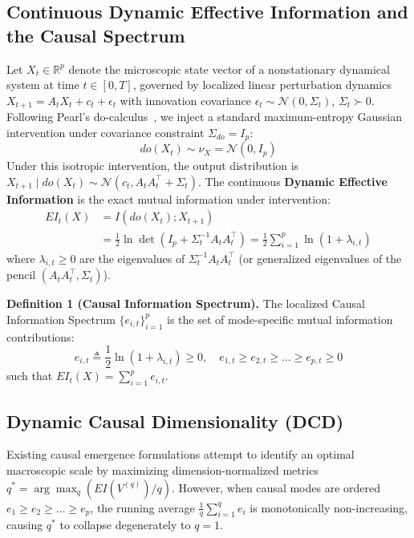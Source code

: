 \documentclass[10pt,twocolumn,journal]{article}
\begin{document}
\subsection{Continuous Dynamic Effective Information and the Causal Spectrum}
Let $X_t \in \mathbb{R}^p$ denote the microscopic state vector of a nonstationary dynamical system at time $t \in [0, T]$, governed by localized linear perturbation dynamics $X_{t+1} = A_t X_t + c_t + \epsilon_t$ with innovation covariance $\epsilon_t \sim \mathcal{N}(0, \Sigma_t)$, $\Sigma_t \succ 0$. Following Pearl's do-calculus~\cite{pearl2009causality,hoel2013quantifying}, we inject a standard maximum-entropy Gaussian intervention under covariance constraint $\Sigma_{do} = I_p$:
\begin{equation}
do(X_t) \sim \nu_X = \mathcal{N}(0, I_p)
\label{eq:intervention_def}
\end{equation}
Under this isotropic intervention, the output distribution is $X_{t+1} \mid do(X_t) \sim \mathcal{N}(c_t, A_t A_t^\top + \Sigma_t)$. The continuous \textbf{Dynamic Effective Information} is the exact mutual information under intervention:
\begin{equation}
\begin{aligned}
EI_t(X) &= I(do(X_t) ; X_{t+1}) \\
&= \frac{1}{2} \ln \det \left( I_p + \Sigma_t^{-1} A_t A_t^\top \right) = \frac{1}{2} \sum_{i=1}^p \ln \left( 1 + \lambda_{i,t} \right)
\end{aligned}
\label{eq:gaussian_ei}
\end{equation}
where $\lambda_{i,t} \ge 0$ are the eigenvalues of $\Sigma_t^{-1} A_t A_t^\top$ (or generalized eigenvalues of the pencil $(A_t A_t^\top, \Sigma_t)$).

\noindent \textbf{Definition 1 (Causal Information Spectrum).} The localized Causal Information Spectrum $\{e_{i,t}\}_{i=1}^p$ is the set of mode-specific mutual information contributions:
\begin{equation}
e_{i,t} \triangleq \frac{1}{2} \ln \left( 1 + \lambda_{i,t} \right) \ge 0, \quad e_{1,t} \ge e_{2,t} \ge \dots \ge e_{p,t} \ge 0
\end{equation}
such that $EI_t(X) = \sum_{i=1}^p e_{i,t}$.

\subsection{Dynamic Causal Dimensionality (DCD)}
Existing causal emergence formulations attempt to identify an optimal macroscopic scale by maximizing dimension-normalized metrics $q^* = \arg\max_q (EI(V^{(q)})/q)$. However, when causal modes are ordered $e_1 \ge e_2 \ge \dots \ge e_p$, the running average $\frac{1}{q}\sum_{i=1}^q e_i$ is monotonically non-increasing, causing $q^*$ to collapse degenerately to $q=1$. 
\end{document}
